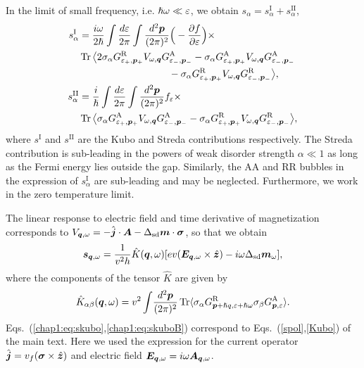 In the limit of small frequency, i.e. $\hslash\omega\ll\varepsilon$, we obtain $s_\alpha = s^\text{I}_\alpha+s^\text{II}_\alpha$,
\begin{align}
    s^\text{I}_\alpha&=\frac{i\omega}{2\hslash}\int\frac{d\ep}{2\pi}\int \frac{d^2\bb{p}}{(2\pi)^2}\Big(-\frac{\partial f}{\partial \ep}\Big)\times\nonumber\\
    &\tr\big\langle
    2\sigma_\alpha G^\text{R}_{\ep_+,\bb{p}_+} V_{\omega,\bb{q}} G^\text{A}_{\ep_-,\bb{p}_-}-\sigma_\alpha G^\text{A}_{\ep_+,\bb{p}_+} V_{\omega,\bb{q}} G^\text{A}_{\ep_-,\bb{p}_-} \nonumber\\
    &\hspace{3.2cm}-\sigma_\alpha G^\text{R}_{\ep_+,\bb{p}_+} V_{\omega,\bb{q}} G^\text{R}_{\ep_-,\bb{p}_-}\big\rangle,\\
    s^\text{II}_\alpha&=\frac{i}{\hslash}\int\frac{d\ep}{2\pi}\int \frac{d^2\bb{p}}{(2\pi)^2} f_\ep\times\nonumber\\
     &\tr \big\langle\sigma_\alpha
    G^\text{A}_{\ep_+,\bb{p}_+} V_{\omega,\bb{q}} G^\text{A}_{\ep_-,\bb{p}_-}-
    \sigma_\alpha G^\text{R}_{\ep_+,\bb{p}_+} V_{\omega,\bb{q}} G^\text{R}_{\ep_-,\bb{p}_-}\big\rangle,
\end{align}
where $s^{\text{I}}$ and $s^\text{II}$ are the Kubo and Streda contributions respectively. The Streda contribution is sub-leading in the powers of weak disorder strength $\alpha\ll 1$ as long as the Fermi energy lies outside the gap. Similarly, the AA and RR bubbles in the expression of $s_\alpha^\text{I}$ are sub-leading and may be neglected. Furthermore, we work in the zero temperature limit. 

The linear response to electric field and time derivative of magnetization corresponds to $V_{\boldsymbol{q},\omega} = -\hat{\boldsymbol{j}}
\cdot\boldsymbol{A}-\Delta_\text{sd} \boldsymbol{m}\cdot\boldsymbol{\sigma}$, so that we obtain
\begin{equation}
  \boldsymbol{s}_{\boldsymbol{q},\omega}=\frac{1}{v^2h}\hat{K}(\boldsymbol{q},\omega)[ev(\boldsymbol{E}_{\boldsymbol{q},\omega}\times\hat{\boldsymbol{z}})-i\omega\Delta_{\text{sd}}\boldsymbol{m}_{\omega}],
  \label{chap1:eq:skubo}
\end{equation}
where the components of the tensor $\hat{K}$ are given by
\begin{equation}
\hat{K}_{\alpha\beta}(\boldsymbol{q},\omega)={v^2}\int\!\frac{d^2\boldsymbol{p}}{(2\pi)^2}\operatorname{Tr} \langle \sigma_\alpha G^\text{R}_{\boldsymbol{p}+ \hslash q,\varepsilon+\hslash\omega}\sigma_\beta G^\text{A}_{\boldsymbol{p},\varepsilon}\rangle.
\label{chap1:eq:skuboB}
\end{equation}
Eqs.~(\ref{chap1:eq:skubo},\ref{chap1:eq:skuboB}) correspond to Eqs.~(\ref{spol},\ref{Kubo}) of the main text. Here we used the expression for the current operator $\hat{\boldsymbol{j}} = v_f(\boldsymbol{\sigma}\times\hat{\boldsymbol{z}})$ and electric field $\boldsymbol{E}_{\boldsymbol{q},\omega}=i\omega \boldsymbol{A}_{\boldsymbol{q},\omega}$.

